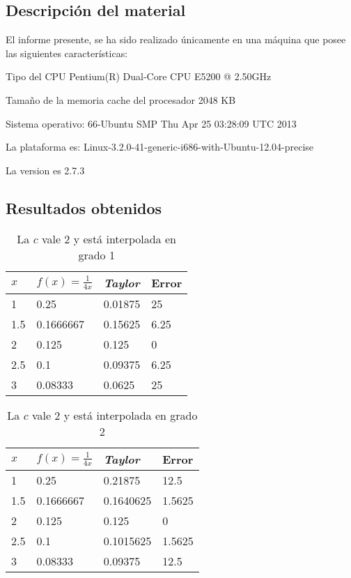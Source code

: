 \documentclass[a4paper,12pt]{article}
\begin{document}
\subsection{Descripción del material}
El informe presente, se ha sido realizado únicamente en una máquina que posee las siguientes características:

Tipo del CPU Pentium(R) Dual-Core  CPU      E5200  @ 2.50GHz

Tamaño de la memoria cache del procesador 2048 KB

Sistema operativo: 66-Ubuntu SMP Thu Apr 25 03:28:09 UTC 2013

La plataforma es: Linux-3.2.0-41-generic-i686-with-Ubuntu-12.04-precise

La version es 2.7.3
\newpage
\subsection{Resultados obtenidos}
\begin{table}[!hbt]
\begin{center}
\begin{tabular}[c]{||l | l ||l|l||}
\hline
\hline
$x$  & $f(x)=\frac{1}{4x}$ &{\em Taylor} & Error \\
\hline
1 &0.25& 0.01875 & 25\\
\hline
1.5 &0.1666667&0.15625& 6.25\\
\hline
2 &0.125 &0.125 &  0 \\
\hline
2.5 &0.1 &0.09375 &  6.25 \\
\hline
3 &  0.08333 &  0.0625 &  25 \\
\hline
\hline
\end{tabular}
\caption{La $c$ vale 2 y está interpolada en grado 1}
\end{center}
\end{table}

\begin{table}[!hbt]
\begin{center}
\begin{tabular}[c]{||l | l ||l|l||}
\hline
\hline
$x$  & $f(x)=\frac{1}{4x}$ &{\em Taylor} & Error \\
\hline
1 &0.25 & 0.21875 &12.5 \\
\hline
1.5 &0.1666667  & 0.1640625& 1.5625  \\
\hline
2 &0.125 &0.125 &  0 \\
\hline
2.5 &0.1 &0.1015625 & 1.5625  \\
\hline
3 &  0.08333 &  0.09375& 12.5  \\
\hline
\hline
\end{tabular}
\caption{La $c$ vale 2 y está interpolada en grado 2}
\end{center}
\end{table}
\end{document}
